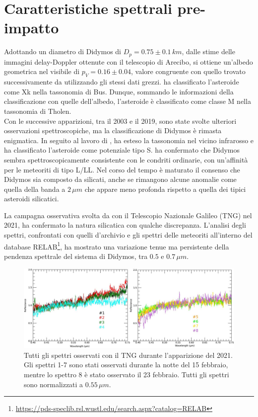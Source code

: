 \section{Caratteristiche spettrali pre-impatto}
Adottando un diametro di Didymos di $D_p=0.75 \pm 0.1\, km$, dalle stime delle immagini delay-Doppler ottenute con il telescopio di Arecibo, si ottiene un'albedo geometrica nel visibile di $p_V=0.16 \pm 0.04$, valore congruente con quello trovato successivamente da \citet{naidu_radar_2020} utilizzando gli stessi dati grezzi. \citet{binzel_observed_2004} ha classificato l'asteroide come Xk nella tassonomia di Bus. Dunque, sommando le informazioni della classificazione con quelle dell'albedo, l'asteroide è classificato come classe M nella tassonomia di Tholen.\\
Con le successive apparizioni, tra il 2003 e il 2019, sono state svolte ulteriori osservazioni spettroscopiche, ma la classificazione di Didymos è rimasta enigmatica. In seguito al lavoro di \citet{binzel_observed_2004}, \citet{de_leon_spectral_2006, de_leon_observations_2010} ha esteso la tassonomia nel vicino infrarosso e ha classificato l'asteroide come potenziale tipo S. \citet{dunn_mineralogies_2013} ha confermato che Didymos sembra spettroscopicamente consistente con le condriti ordinarie, con un'affinità per le meteoriti di tipo L/LL. Nel corso del tempo è maturato il consenso che Didymos sia composto da silicati, anche se rimangono alcune anomalie come quella della banda a $2\,\mu m$ che appare meno profonda rispetto a quella dei tipici asteroidi silicatici. 

La campagna osservativa svolta da \citet{ieva_spectral_2022} con il Telescopio Nazionale Galileo (TNG) nel 2021, ha confermato la natura silicatica con qualche discrepanza. L'analisi degli spettri, confrontati con quelli d'archivio e gli spettri delle meteoriti all'interno del database RELAB\footnote{\href{https://pds-speclib.rsl.wustl.edu/search.aspx?catalog=RELAB}{https://pds-speclib.rsl.wustl.edu/search.aspx?catalog=RELAB}}, ha mostrato una variazione tenue ma persistente della pendenza spettrale del sistema di Didymos, tra $0.5$ e $0.7\,\mu m$. 

\begin{figure}[!h]
    \centering
    \includegraphics[scale=0.65]{figure/spettri_tot_ieva.jpg}
    \caption[Spettri osservati con il TNG durante l'apparizione del 2021.]{Tutti gli spettri osservati con il TNG durante l'apparizione del 2021. Gli spettri 1-7 sono stati osservati durante la notte del 15 febbraio, mentre lo spettro 8 è stato osservato il 23 febbraio. Tutti gli spettri sono normalizzati a $0.55\,\mu m$. \citep{ieva_spectral_2022}}
    \label{fig:spettri_tot_ieva}
\end{figure}

